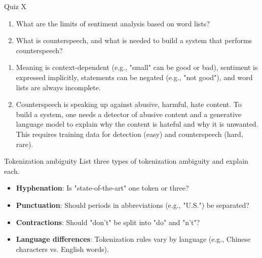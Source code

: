\documentclass{article}
\begin{document}
\begin{exercise}{Quiz X}
  \begin{enumerate}
    \item What are the limits of sentiment analysis based on word lists?
    \item What is counterspeech, and what is needed to build a system that performs counterspeech?
  \end{enumerate}

  \begin{solution}
    \begin{enumerate}
      \item Meaning is context-dependent (e.g., "small" can be good or bad), sentiment is expressed implicitly, statements can be negated (e.g., "not good"), and word lists are always incomplete.
      \item Counterspeech is speaking up against abusive, harmful, hate content. To build a system, one needs a detector of abusive content and a generative language model to explain why the content is hateful and why it is unwanted. This requires training data for detection (easy) and counterspeech (hard, rare).
    \end{enumerate}
  \end{solution}
\end{exercise}




\begin{exercise}{Tokenization ambiguity}\label{ex:tokenization}
  List three types of tokenization ambiguity and explain each.

  \begin{solution}
    \begin{itemize}
      \item \textbf{Hyphenation}: Is "state-of-the-art" one token or three?
      \item \textbf{Punctuation}: Should periods in abbreviations (e.g., "U.S.") be separated?
      \item \textbf{Contractions}: Should "don't" be split into "do" and "n't"?
      \item \textbf{Language differences}: Tokenization rules vary by language (e.g., Chinese characters vs. English words).
    \end{itemize}
  \end{solution}
\end{exercise}
\end{document}
